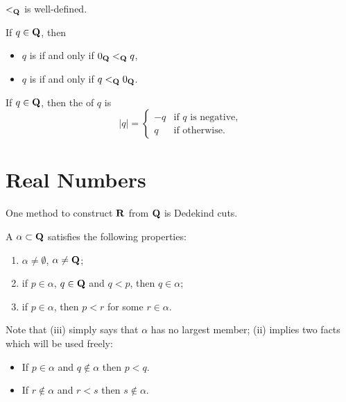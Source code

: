 \begin{proposition}
$<_\mathbf Q$ is well-defined.
\end{proposition}

\begin{definition}
If $q\in\mathbf Q$, then
\begin{itemize}
\item $q$ is  if and only if $0_\mathbf Q<_\mathbf Q q$,
\item $q$ is  if and only if $q<_\mathbf Q0_\mathbf Q$.
\end{itemize}
\end{definition}

\begin{definition}
If $q\in\mathbf Q$, then the  of $q$ is
\[|q|=\begin{cases}
-q&\text{if $q$ is negative,}\\
q&\text{if otherwise.}
\end{cases}\]
\end{definition}
\pagebreak

\section{Real Numbers}
One method to construct $\mathbf R$ from $\mathbf Q$ is Dedekind cuts.

\begin{definition}
A  $\alpha\subset\mathbf Q$ satisfies the following properties:
\begin{enumerate}[label=(\roman*)]
\item $\alpha\neq\emptyset$, $\alpha\neq\mathbf Q$;
\item if $p\in\alpha$, $q\in\mathbf Q$ and $q<p$, then $q\in\alpha$;
\item if $p\in\alpha$, then $p<r$ for some $r\in\alpha$.
\end{enumerate}
\end{definition}

Note that (iii) simply says that $\alpha$ has no largest member; (ii) implies two facts which will be used freely:
\begin{itemize}
\item If $p\in\alpha$ and $q\notin\alpha$ then $p<q$.
\item If $r\notin\alpha$ and $r<s$ then $s\notin\alpha$.
\end{itemize}

